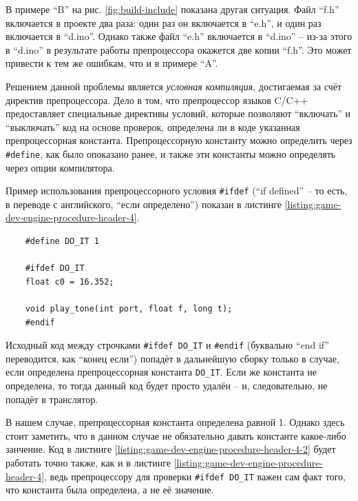 \documentclass[../sparc.tex]{subfiles}
\begin{document}
В примере ``B'' на рис. \ref{fig:build-include} показана другая ситуация.  Файл
``f.h'' включается в проекте два раза: один раз он включается в ``e.h'', и один
раз включается в ``d.ino''.  Однако также файл ``e.h'' включается в ``d.ino'' --
из-за этого в ``d.ino'' в результате работы препроцессора окажется две копии
``f.h''.  Это может привести к тем же ошибкам, что и в примере ``A''.

Решением данной проблемы является \emph{условная компиляция}, достигаемая за
счёт директив препроцессора.  Дело в том, что препроцессор языков C/C++
предоставляет специальные директивы условий, которые позволяют ``включать'' и
``выключать'' код на основе проверок, определена ли в коде указанная
препроцессорная константа.  Препроцессорную константу можно определить через
\texttt{#define}, как было опоказано ранее, и также эти константы можно
определять через опции компилятора.

Пример использования препроцессорного условия \texttt{#ifdef} (``if
defined'' -- то есть, в переводе с английского, ``если определено'') показан в
листинге \ref{listing:game-dev-engine-procedure-header-4}.

\begin{listing}[H]
  \begin{verbatim}
    #define DO_IT 1

    #ifdef DO_IT
    float c0 = 16.352;

    void play_tone(int port, float f, long t);
    #endif
  \end{verbatim}
  \label{listing:game-dev-engine-procedure-header-4}
  \caption{Пример использования препроцессорного условия.}
\end{listing}

Исходный код между строчками \texttt{#ifdef DO_IT} и
\texttt{#endif} (буквально ``end if'' переводится, как ``конец если'')
попадёт в дальнейшую сборку только в случае, если определена препроцессорная
константа \texttt{DO_IT}.  Если же константа не определена, то тогда
данный код будет просто удалён -- и, следовательно, не попадёт в транслятор.

В нашем случае, препроцессорная константа определена равной 1.  Однако здесь
стоит заметить, что в данном случае не обязательно давать константе какое-либо
занчение.  Код в листинге \ref{listing:game-dev-engine-procedure-header-4-2}
будет работать точно также, как и в листинге
\ref{listing:game-dev-engine-procedure-header-4}, ведь препроцессору для
проверки \texttt{#ifdef DO_IT} важен сам факт того, что константа была
определена, а не её значение.
\end{document}

